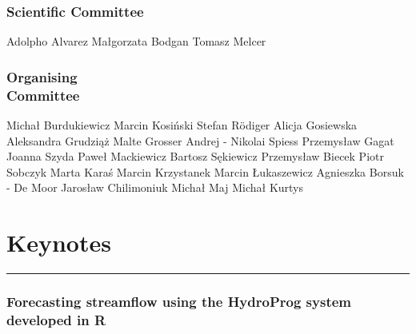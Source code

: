\documentclass [12pt]{article}
\begin{document}
\begin{multicols}{2}
    \section*{Scientific Committee}
    Adolpho Alvarez \newline
Małgorzata Bodgan \newline
Tomasz Melcer \newline
    \section*{Organising \\ Committee}
    Michał Burdukiewicz \newline
Marcin Kosiński \newline
Stefan Rödiger \newline
Alicja Gosiewska \newline
Aleksandra Grudziąż \newline
Malte Grosser \newline
Andrej - Nikolai Spiess \newline
Przemysław Gagat \newline
Joanna Szyda \newline
Paweł Mackiewicz \newline
Bartosz Sękiewicz \newline
Przemysław Biecek \newline
Piotr Sobczyk \newline
Marta Karaś \newline
Marcin Krzystanek \newline
Marcin Łukaszewicz \newline
Agnieszka Borsuk - De Moor \newline
Jarosław Chilimoniuk \newline
Michał Maj \newline
Michał Kurtys
\end{multicols}
\newpage
{}
\tableofcontents
\newpage
{}
\part{Keynotes}
\noindent\rule{\textwidth}{1pt}
\section{Forecasting streamflow using the HydroProg system developed in R}
\end{document}
